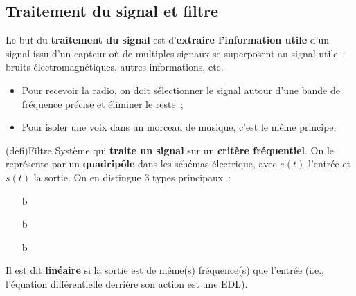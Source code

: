 \documentclass[../../main/main.tex]{subfiles}
\begin{document}
\subsection{Traitement du signal et filtre}
Le but du \textbf{traitement du signal} est d'\textbf{extraire l'information
	utile} d'un signal issu d'un capteur où de multiples signaux se superposent au
signal utile~: bruits électromagnétiques, autres informations, etc.
\begin{itemize}
	\item Pour recevoir la radio, on doit sélectionner le signal autour d'une
	      bande de fréquence précise et éliminer le reste~;
	\item Pour isoler une voix dans un morceau de musique, c'est le même principe.
\end{itemize}

\begin{tcb*}[sidebyside, righthand ratio=.3](defi){Filtre}
	Système qui \textbf{traite un signal} sur un \textbf{critère fréquentiel}. On
	le représente par un \textbf{quadripôle} dans les schémas électrique, avec
	$e(t)$ l'entrée et $s(t)$ la sortie. On en distingue 3 types principaux~:
	\begin{itemize}
		\item[b]{}
		\item[b]{}
		\item[b]{}
	\end{itemize}
	Il est dit \textbf{linéaire} si la sortie est de même(s) fréquence(s) que
	l'entrée (i.e., l'équation différentielle derrière son action est une EDL).
	\tcblower
	\begin{center}
	\end{center}
\end{tcb*}
\end{document}
